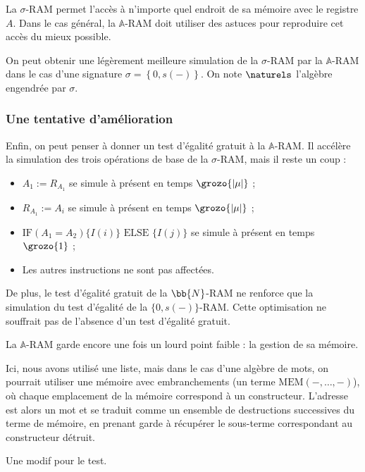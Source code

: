 \documentclass{article}
\newcommand{\sRAMifc}[2]{\text{IF} (A_1=A_2) \{I( #1 )\} \text{ ELSE } \{I( #2 )\}}
\newcommand{\bbA}{\mathbb{A}}
\begin{document}
			La $\sigma$-RAM permet l'accès à n'importe quel endroit de sa mémoire avec le registre $A$. Dans le cas général, la $\bbA$-RAM doit utiliser des astuces pour reproduire cet accès du mieux possible. 
			
			
			On peut obtenir une légèrement meilleure simulation de la $\sigma$-RAM par la $\bbA$-RAM dans le cas d'une signature $\sigma = \left\lbrace 0, s(-)\right\rbrace$. On note $\naturels$ l'algèbre engendrée par $\sigma$.


			\subsubsection{Une tentative d'amélioration}

			
			Enfin, on peut penser à donner un test d'égalité gratuit à la $\bbA$-RAM. Il accélère la simulation des trois opérations de base de la $\sigma$-RAM, mais il reste un coup : 
			
			\begin{itemize}
				\setlength{\itemsep}{-1mm}
				\item 	$A_1 := R_{A_1}$ se simule à présent en temps $\grozo{\left| \mu \right|}$ ;
				\item 	$R_{A_1} := A_i$ se simule à présent en temps $\grozo{\left| \mu \right|}$ ;
				\item 	$\sRAMifc{i}{j}$ se simule à présent en temps $\grozo{1}$ ;
				\item 	Les autres instructions ne sont pas affectées.
			\end{itemize}
			
			De plus, le test d'égalité gratuit de la $\bb{N}$-RAM ne renforce que la simulation du test d'égalité de la $\{0,s(-)\}$-RAM. Cette optimisation ne souffrait pas de l'absence d'un test d'égalité gratuit. 
			
			La $\bbA$-RAM garde encore une fois un lourd point faible : la gestion de sa mémoire.
			
			Ici, nous avons utilisé une liste, mais dans le cas d'une algèbre de mots, on pourrait utiliser une mémoire avec embranchements (un terme $\text{MEM}\left( -, \dots, -\right)$), où chaque emplacement de la mémoire correspond à un constructeur. L'adresse est alors un mot et se traduit comme un ensemble de destructions successives du terme de mémoire, en prenant garde à récupérer le sous-terme correspondant au constructeur détruit.
			
			
			Une modif pour le test.
\end{document}
